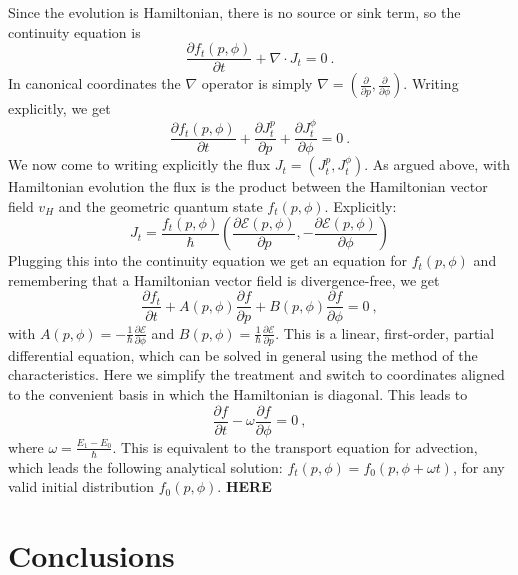\documentclass[draft,nofootinbib,pre,twocolumn,showpacs,showkeys,preprintnumbers,floatfix]{revtex4-1}
\newcommand{\1}{\mathbbm{1}}
\newcommand{\p}{\partial}
\begin{document}
Since the evolution is Hamiltonian, there is no source or sink term, so the continuity equation is 
\begin{equation}
\frac{\partial f_t(p,\phi)}{\partial t} + \nabla \cdot J_t = 0~.
\end{equation}
In canonical coordinates the $\nabla$ operator is simply $\nabla = (\frac{\p }{\p p},\frac{\p }{\p \phi})$.
Writing explicitly, we get
\begin{equation}
\frac{\partial f_t(p,\phi)}{\partial t} + \frac{\p J_t^p}{\p p} + \frac{\p J_t^{\phi}}{\p \phi} = 0~.
\end{equation}
We now come to writing explicitly the flux $J_t = (J_t^p,J_t^{\phi})$. As argued above, 
with Hamiltonian evolution the flux is the product between the Hamiltonian vector 
field $v_H$ and the geometric quantum state $f_t(p,\phi)$. Explicitly:
\begin{equation}
J_t =  \frac{f_t(p,\phi)}{\hbar} \left(\frac{\p \mathcal{E}(p,\phi)}{\p p}, -\frac{\p \mathcal{E}(p,\phi)}{\p \phi}\right)
\end{equation}
Plugging this into the continuity equation we get an equation for $f_t(p,\phi)$ and remembering
that a Hamiltonian vector field is divergence-free, we get
\begin{equation}
\frac{\partial f_t}{\partial t} + A(p,\phi) \frac{\partial f}{\partial p} + B(p,\phi) \frac{\partial f}{\partial \phi} = 0~,
\end{equation}
with $A(p,\phi) = - \frac{1}{\hbar}\frac{\partial \mathcal{E}}{\partial \phi}$ and $B(p,\phi) = \frac{1}{\hbar}\frac{\partial \mathcal{E}}{\partial p}$.
This is a linear, first-order, partial differential equation, which can be solved 
in general using the method of the characteristics. Here we simplify the treatment 
and switch to coordinates aligned to the convenient basis in which the Hamiltonian 
is diagonal. This leads to
\begin{equation}
\frac{\partial f}{\partial t} - \omega \frac{\partial f}{\partial \phi} = 0~,
\end{equation}
where $\omega = \frac{E_1 - E_0}{\hbar}$. This is equivalent to the transport 
equation for advection, which leads the following analytical solution: $f_t(p,\phi) = f_0(p,\phi+\omega t)$,
for any valid initial distribution $f_0(p,\phi)$.
{\bf HERE}





\section{Conclusions}
\label{sec:FINAL}
\end{document}
